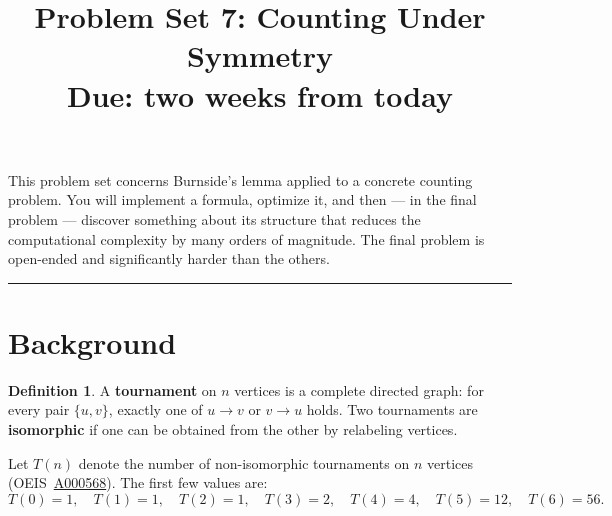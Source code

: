 \documentclass[11pt,letterpaper]{article}
\title{\textbf{Problem Set 7: Counting Under Symmetry} \\[4pt] \normalsize Due: two weeks from today}
\author{}
\date{}
\theoremstyle{definition}
\newtheorem{definition}[theorem]{Definition}
\begin{document}
\maketitle
\thispagestyle{fancy}

\noindent This problem set concerns Burnside's lemma applied to a concrete counting problem. You will implement a formula, optimize it, and then --- in the final problem --- discover something about its structure that reduces the computational complexity by many orders of magnitude. The final problem is open-ended and significantly harder than the others.

\bigskip\hrule\bigskip

\section*{Background}

\begin{definition}
A \textbf{tournament} on $n$ vertices is a complete directed graph: for every pair $\{u,v\}$, exactly one of $u \to v$ or $v \to u$ holds. Two tournaments are \textbf{isomorphic} if one can be obtained from the other by relabeling vertices.
\end{definition}

\begin{center}
\end{center}

\noindent Let $T(n)$ denote the number of non-isomorphic tournaments on $n$ vertices (OEIS~\href{https://oeis.org/A000568}{A000568}). The first few values are:
\[
T(0) = 1,\quad T(1) = 1,\quad T(2) = 1,\quad T(3) = 2,\quad T(4) = 4,\quad T(5) = 12,\quad T(6) = 56.
\]

\bigskip

\end{document}
